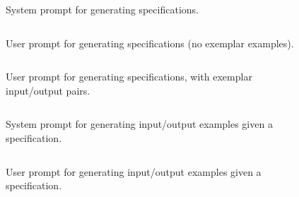 \begin{figure}[!h]
    \centering
   \begin{tcolorbox}[colframe=borderblue, colback=bggray, left=1mm, right=1mm, top=0.5mm, bottom=0.5mm]
\inputminted[fontsize=\scriptsize, breaklines, breakanywhere, breaksymbolleft={}]{markdown}{figures/prompts/specs_system.md}
\end{tcolorbox}
     \caption{\label{fig:prompt_specs_system}System prompt for generating specifications.}
\end{figure}

\begin{figure}[!h]
    \centering
   \begin{tcolorbox}[colframe=borderblue, colback=bggray, left=1mm, right=1mm, top=0.5mm, bottom=0.5mm]
\inputminted[fontsize=\scriptsize, breaklines, breakanywhere, breaksymbolleft={}]{markdown}{figures/prompts/specs_user.md}
\end{tcolorbox}
     \caption{\label{fig:prompt_specs_user}User prompt for generating specifications (no exemplar examples).}
\end{figure}

\begin{figure}[!h]
    \centering
   \begin{tcolorbox}[colframe=borderblue, colback=bggray, left=1mm, right=1mm, top=0.5mm, bottom=0.5mm]
\inputminted[fontsize=\scriptsize, breaklines, breakanywhere, breaksymbolleft={}]{markdown}{figures/prompts/specs_user_with_examples.md}
\end{tcolorbox}
     \caption{\label{fig:prompt_specs_user_with_examples}User prompt for generating specifications, with exemplar input/output pairs.}
\end{figure}

\begin{figure}[!h]
    \centering
   \begin{tcolorbox}[colframe=borderblue, colback=bggray, left=1mm, right=1mm, top=0.5mm, bottom=0.5mm]
\inputminted[fontsize=\scriptsize, breaklines, breakanywhere, breaksymbolleft={}]{markdown}{figures/prompts/data_system.md}
\end{tcolorbox}
     \caption{\label{fig:prompt_data_system}System prompt for generating input/output examples given a specification.}
\end{figure}

\begin{figure}[!h]
    \centering
   \begin{tcolorbox}[colframe=borderblue, colback=bggray, left=1mm, right=1mm, top=0.5mm, bottom=0.5mm]
\inputminted[fontsize=\scriptsize, breaklines, breakanywhere, breaksymbolleft={}]{markdown}{figures/prompts/data_user.md}
\end{tcolorbox}
     \caption{\label{fig:prompt_data_user}User prompt for generating input/output examples given a specification.}
\end{figure}


